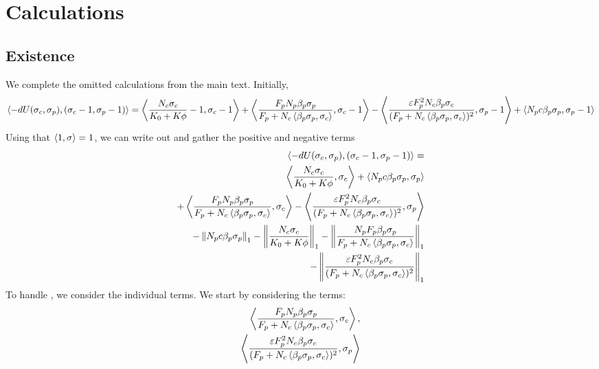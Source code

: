 \section{Calculations}
\subsection{Existence}
\label{appendix:calculations}
We complete the omitted calculations from the main text. Initially,
\begin{equation}
  \label{eq:calc_app}
  \ip{-dU(\sigma_c,\sigma_p)}{(\sigma_c-1, \sigma_p-1)} = \ip{\frac{N_c\sigma_c}{K_0 + K\phi} - 1}{\sigma_c
  - 1} + \ip{\frac{F_p N_p\beta_p\sigma_p}{F_p + N_c\ip{\beta_p\sigma_p}{\sigma_c}}}{\sigma_c-1}
  - \ip{\frac{\epsilon F_p^2N_c\beta_p\sigma_c}{(F_p + N_c\ip{\beta_p\sigma_p}{\sigma_c})^2}}{\sigma_p - 1} + \ip{N_p c \beta_p \sigma_p}{\sigma_p -1}
\end{equation}
Using that $\left \langle 1,\sigma \right \rangle = 1$, we can write out  and gather the positive and negative terms
\begin{equation}
  \label{eq:tot_min_du}
  \begin{split}
  \ip{-dU(\sigma_c,\sigma_p)}{(\sigma_c-1, \sigma_p-1)} = \\
  \ip{\frac{N_c\sigma_c}{K_0 + K\phi}}{\sigma_c} + \ip{N_p c \beta_p \sigma_p}{\sigma_p} \\ + \ip{\frac{F_p N_p \beta_p\sigma_p}{F_p + N_c\ip{\beta_p\sigma_p}{\sigma_c}}}{\sigma_c} - \ip{\frac{\epsilon F_p^2 N_c\beta_p\sigma_c}{(F_p + N_c\ip{\beta_p\sigma_p}{\sigma_c})^2}}{\sigma_p} \\
  - \norm{N_p c\beta_p \sigma_p}_1 - \norm{\frac{N_c \sigma_c}{K_0 + K\phi}}_1 - \norm{\frac{N_p F_p\beta_p\sigma_p}{F_p + N_c \ip{\beta_p\sigma_p}{\sigma_c}}}_1 \\
   - \norm{\frac{\epsilon F_p^2 N_c\beta_p\sigma_c}{(F_p + N_c\ip{\beta_p\sigma_p}{\sigma_c})^2}}_1
\end{split}
\end{equation}
To handle , we consider the individual terms. We start by considering the terms:
\begin{equation}
  \label{eq:unf_bnd}
  \begin{split}
  \left \langle \frac{F_p N_p\beta_p\sigma_p}{F_p + N_c\left \langle \beta_p\sigma_p,\sigma_c \right \rangle},\sigma_c \right \rangle, \\
   \left \langle \frac{\varepsilon F_p^2 N_c \beta_p\sigma_c}{(F_p + N_c\left \langle \beta_p\sigma_p,\sigma_c \right \rangle)^2},\sigma_p \right \rangle
  \end{split}
\end{equation}
